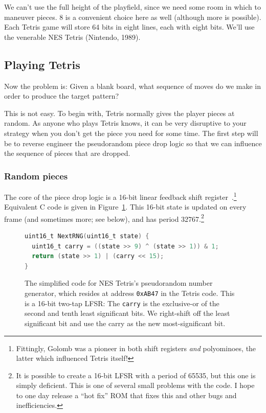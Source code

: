 \documentclass[twocolumn]{article}
\begin{document}
We can't use the full height of the playfield, since we need some
room in which to maneuver pieces. 8 is a convenient choice here as
well (although more is possible). Each Tetris game will store 64 bits
in eight lines, each with eight bits. We'll use the venerable
NES Tetris (Nintendo, 1989).


\subsection{Playing Tetris}

Now the problem is: Given a blank board, what sequence of moves do
we make in order to produce the target pattern?

This is not easy. To begin with, Tetris normally gives the player
pieces at random. As anyone who plays Tetris knows, it can be very
disruptive to your strategy when you don't get the piece you need for
some time. The first step will be to reverse engineer the pseudorandom
piece drop logic so that we can influence the sequence of pieces that
are dropped.

\subsubsection{Random pieces}

The core of the piece drop logic is a 16-bit linear feedback shift
register~\cite{golomb1967shift}.\!\footnote{Fittingly, Golomb was a
  pioneer in both shift registers {\em and} polyominoes, the latter
  which influenced Tetris itself!} Equivalent C code is given in
Figure~\ref{fig:nextrng}. This 16-bit state is updated on every frame
(and sometimes more; see below), and has period 32767.\footnote{ It is
  possible to create a 16-bit LFSR with a period of 65535, but this
  one is simply deficient. This is one of several small problems with
  the code. I hope to one day release a ``hot fix'' ROM that fixes
  this and other bugs and inefficiencies.}

\begin{figure}
  \centering
  \begin{lstlisting}[language=C]
uint16_t NextRNG(uint16_t state) {
  uint16_t carry = ((state >> 9) ^ (state >> 1)) & 1;
  return (state >> 1) | (carry << 15);
}
  \end{lstlisting}
  \caption { The simplified code for NES Tetris's pseudorandom number
    generator, which resides at address {\tt 0xAB47} in the Tetris
    code. This is a 16-bit two-tap LFSR: The {\tt carry} is the
    exclusive-or of the second and tenth least significant bits. We
    right-shift off the least significant bit and use the carry as the
    new most-significant bit.} \label{fig:nextrng}
\end{figure}
\end{document}
